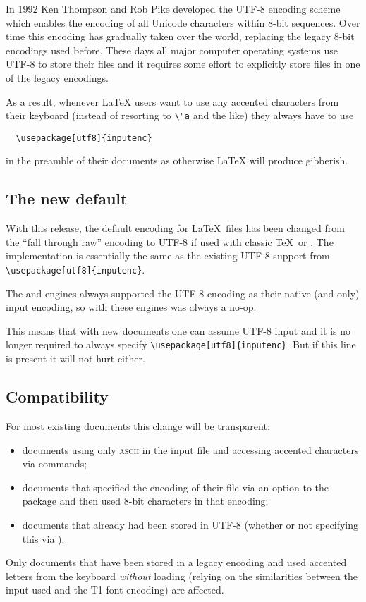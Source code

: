 \documentclass{ltnews}
\providecommand\acro[1]{\textsc{#1}}
\begin{document}
In 1992 Ken Thompson and Rob Pike developed the UTF-8 encoding scheme
which enables the encoding of all Unicode characters within 8-bit sequences.
Over time this encoding has gradually taken over the world,
replacing the legacy 8-bit encodings used before. These days all major
computer operating systems use UTF-8 to store their files and it
requires some effort to explicitly store files in one of the legacy
encodings.

As a result, whenever \LaTeX{} users want to use any accented
characters from their keyboard (instead of resorting to \verb=\"a= and
the like) they always have to use
\begin{verbatim}
  \usepackage[utf8]{inputenc}
\end{verbatim}
in the preamble of their documents as otherwise \LaTeX{} will produce
gibberish.

\subsection{The new default}

With this release, the default encoding for \LaTeX\ files has been
changed from the ``fall through raw'' encoding to UTF-8 if used with
classic \TeX\ or . The implementation is essentially
the same as the existing UTF-8 support from
\verb|\usepackage[utf8]{inputenc}|.  

The  and  engines always supported the
UTF-8 encoding as their native (and only) input encoding, so with
these engines  was always a no-op.

This means that with new documents one can assume UTF-8 input and it
is no longer required to always specify
\verb|\usepackage[utf8]{inputenc}|. But if this line is present it
will not hurt either.


\subsection{Compatibility}

For most existing documents this change will be transparent:
\begin{itemize}
\item documents using only \acro{ascii} in the input file and
  accessing accented characters via commands;
\item documents that specified the encoding of their file via an
  option to the  package and then used 8-bit
  characters in that encoding;
\item documents that already had been stored in UTF-8 (whether or not
  specifying this via ).
\end{itemize}
Only documents that have been stored in a legacy encoding and used
accented letters from the keyboard \emph{without} loading
 (relying on the similarities between the input used
and the T1 font encoding) are affected.
\end{document}
